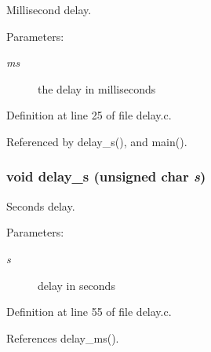 Millisecond delay. 

\begin{Desc}
\item[Parameters:]
\begin{description}
\item[{\em ms}]the delay in milliseconds \end{description}
\end{Desc}


Definition at line 25 of file delay.c.

Referenced by delay\_\-s(), and main().
\subsubsection[{delay\_\-s}]{\setlength{\rightskip}{0pt plus 5cm}void delay\_\-s (unsigned char {\em s})}\label{delay_8c_277087cfe043ab9daa62dd6d42c806e8}


Seconds delay. 

\begin{Desc}
\item[Parameters:]
\begin{description}
\item[{\em s}]delay in seconds \end{description}
\end{Desc}


Definition at line 55 of file delay.c.

References delay\_\-ms().